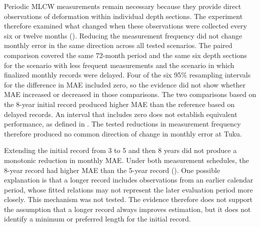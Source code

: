 Periodic MLCW measurements remain necessary because they provide direct observations of deformation within individual depth sections. The experiment therefore examined what changed when these observations were collected every six or twelve months (). Reducing the measurement frequency did not change monthly error in the same direction across all tested scenarios. The paired comparison covered the same 72-month period and the same six depth sections for the scenario with less frequent measurements and the scenario in which finalized monthly records were delayed. Four of the six 95\% resampling intervals for the difference in MAE included zero, so the evidence did not show whether MAE increased or decreased in those comparisons. The two comparisons based on the 8-year initial record produced higher MAE than the reference based on delayed records. An interval that includes zero does not establish equivalent performance, as defined in . The tested reductions in measurement frequency therefore produced no common direction of change in monthly error at Tuku.

Extending the initial record from 3 to 5 and then 8 years did not produce a monotonic reduction in monthly MAE. Under both measurement schedules, the 8-year record had higher MAE than the 5-year record (). One possible explanation is that a longer record includes observations from an earlier calendar period, whose fitted relations may not represent the later evaluation period more closely. This mechanism was not tested. The evidence therefore does not support the assumption that a longer record always improves estimation, but it does not identify a minimum or preferred length for the initial record.

